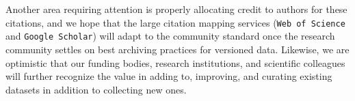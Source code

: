\documentclass[a4paper,11pt]{article}
\begin{document}
Another area requiring attention is properly allocating credit to authors for these citations, and we hope that the large citation mapping services (\texttt{Web of Science} and \texttt{Google Scholar}) will adapt to the community standard once the research community settles on best archiving practices for versioned data. Likewise, we are optimistic that our funding bodies, research institutions, and scientific colleagues will further recognize the value in adding to, improving, and curating existing datasets in addition to collecting new ones.




%
\end{document}
